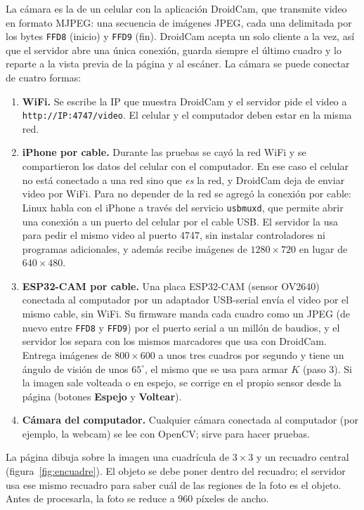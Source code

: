 La cámara es la de un celular con la aplicación DroidCam, que transmite video
en formato MJPEG: una secuencia de imágenes JPEG, cada una delimitada por los
bytes \texttt{FFD8} (inicio) y \texttt{FFD9} (fin). DroidCam acepta un solo
cliente a la vez, así que el servidor abre una única conexión, guarda siempre
el último cuadro y lo reparte a la vista previa de la página y al escáner. La
cámara se puede conectar de cuatro formas:
\begin{enumerate}
  \item \textbf{WiFi.} Se escribe la IP que muestra DroidCam y el servidor pide
        el video a \texttt{http://IP:4747/video}. El celular y el computador
        deben estar en la misma red.
  \item \textbf{iPhone por cable.} Durante las pruebas se cayó la red WiFi y
        se compartieron los datos del celular con el computador. En ese caso
        el celular no está conectado a una red sino que \emph{es} la red, y
        DroidCam deja de enviar video por WiFi. Para no depender de la red se
        agregó la conexión por cable: Linux habla con el iPhone a través del
        servicio \texttt{usbmuxd}, que permite abrir una conexión a un puerto
        del celular por el cable USB. El servidor la usa para pedir el mismo
        video al puerto 4747, sin instalar controladores ni programas
        adicionales, y además recibe imágenes de $1280\times720$ en lugar de
        $640\times480$.
  \item \textbf{ESP32-CAM por cable.} Una placa ESP32-CAM (sensor OV2640)
        conectada al computador por un adaptador USB-serial envía el video por
        el mismo cable, sin WiFi. Su firmware manda cada cuadro como un JPEG
        (de nuevo entre \texttt{FFD8} y \texttt{FFD9}) por el puerto serial a
        un millón de baudios, y el servidor los separa con los mismos
        marcadores que usa con DroidCam. Entrega imágenes de $800\times600$ a
        unos tres cuadros por segundo y tiene un ángulo de visión de unos
        $65^\circ$, el mismo que se usa para armar $K$ (paso 3). Si la imagen
        sale volteada o en espejo, se corrige en el propio sensor desde la
        página (botones \textbf{Espejo} y \textbf{Voltear}).
  \item \textbf{Cámara del computador.} Cualquier cámara conectada al
        computador (por ejemplo, la webcam) se lee con OpenCV; sirve para
        hacer pruebas.
\end{enumerate}

La página dibuja sobre la imagen una cuadrícula de $3\times3$ y un recuadro
central (figura~\ref{fig:encuadre}). El objeto se debe poner dentro del
recuadro; el servidor usa ese mismo recuadro para saber cuál de las regiones
de la foto es el objeto. Antes de procesarla, la foto se reduce a 960 píxeles
de ancho.

